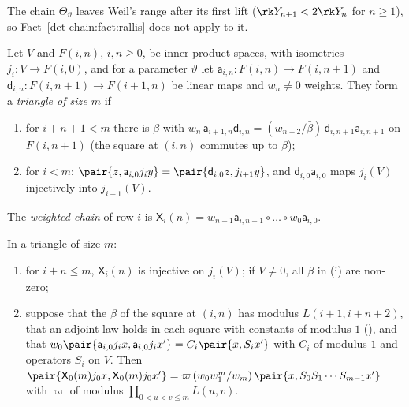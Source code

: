 The chain $\Theta_\vartheta$ leaves Weil's range after its first lift ($\rk Y_{n+1}<2\rk Y_n$ for
$n\ge1$), so Fact~\ref{det-chain:fact:rallis} does not apply to it.

\begin{definition}
\label{det-chain:def:triangle}
Let $V$ and $F(i,n)$, $i,n\ge0$, be inner product spaces, with isometries $j_i\colon V\to F(i,0)$,
and for a parameter $\vartheta$ let $\mathsf a_{i,n}\colon F(i,n)\to F(i,n+1)$ and
$\mathsf d_{i,n}\colon F(i,n+1)\to F(i+1,n)$ be linear maps and $w_n\ne0$ weights. They form a
\emph{triangle of size $m$} if
\begin{enumerate}[label=(\roman*)]
\item for $i+n+1<m$ there is $\beta$ with
  $w_n\,\mathsf a_{i+1,n}\mathsf d_{i,n}=(w_{n+2}/\bar\beta)\,\mathsf d_{i,n+1}\mathsf a_{i,n+1}$ on $F(i,n+1)$ (the square at
  $(i,n)$ commutes up to $\beta$);
\item for $i<m$: $\pair{z,\mathsf a_{i,0}j_iy}=\pair{\mathsf d_{i,0}z,j_{i+1}y}$, and $\mathsf d_{i,0}\mathsf a_{i,0}$ maps $j_i(V)$
  injectively into $j_{i+1}(V)$.
\end{enumerate}
The \emph{weighted chain} of row $i$ is $\mathsf X_i(n)=w_{n-1}\mathsf a_{i,n-1}\circ\dots\circ w_0\mathsf a_{i,0}$.
\end{definition}

\begin{lemma}\label{det-chain:lem:triangle}
In a triangle of size $m$:
\begin{enumerate}[label=(\alph*)]
\item for $i+n\le m$, $\mathsf X_i(n)$ is injective on $j_i(V)$; if $V\ne0$, all $\beta$ in (i) are
  non-zero;
\item suppose that the $\beta$ of the square at $(i,n)$ has modulus $L(i+1,i+n+2)$, that an adjoint
  law holds in each square with constants of modulus $1$
  (), and that
  $w_0\pair{\mathsf a_{i,0}j_ix,\mathsf a_{i,0}j_ix'}=C_i\pair{x,S_ix'}$ with $C_i$ of modulus $1$ and operators
  $S_i$ on $V$. Then
  $\pair{\mathsf X_0(m)j_0x,\mathsf X_0(m)j_0x'}=\varpi\,(w_0w_1^m/w_m)\,\pair{x,S_0S_1\cdots S_{m-1}x'}$ with
  $\varpi$ of modulus $\prod_{0<u<v\le m}L(u,v)$.
\end{enumerate}
\end{lemma}

